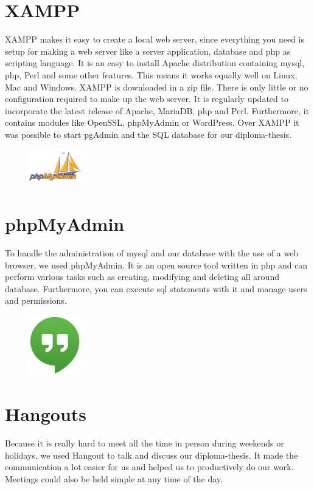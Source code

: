 \section{XAMPP}
XAMPP makes it easy to create a local web server, since everything you need is setup for making a web server like a server application, database and \gls{php} as scripting language. It is an easy to install Apache distribution containing \gls{mysql}, \gls{php}, Perl and some other features. This means it works equally well on Linux, Mac and Windows. XAMPP is downloaded in a zip file. There is only little or no configuration required to make up the web server. It is regularly updated to incorporate the latest release of Apache, MariaDB, \gls{php} and Perl. Furthermore, it contains modules like OpenSSL, phpMyAdmin or WordPress.\newline
Over XAMPP it was possible to start pgAdmin and the SQL database for our diploma-thesis.

\begin{figure}
  \begin{center}
    \includegraphics[width=0.2\textwidth] {bilder/phpMyAdmin}
  \end{center}
\end{figure}
\section{phpMyAdmin}
To handle the administration of \gls{mysql} and our database with the use of a web browser, we used phpMyAdmin. It is an open source tool written in \gls{php} and can perform various tasks such as creating, modifying and deleting all around database. Furthermore, you can execute \gls{sql} statements with it and manage users and permissions.

\begin{figure}
  \begin{center}
    \includegraphics[width=0.2\textwidth] {bilder/hangouts}
  \end{center}
\end{figure}
\section{Hangouts}
Because it is really hard to meet all the time in person during weekends or holidays, we used Hangout to talk and discuss our diploma-thesis. It made the communication a lot easier for us and helped us to productively do our work. Meetings could also be held simple at any time of the day.
